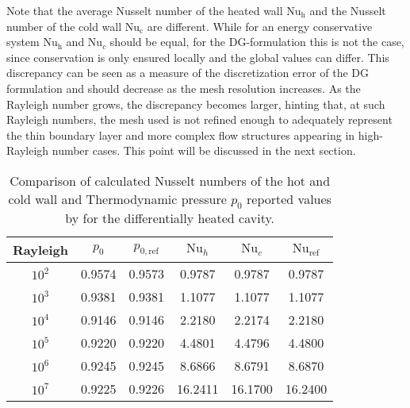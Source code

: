 Note that the average Nusselt number of the heated wall $\text{Nu}_\text{h}$ and the Nusselt number of the cold wall $\text{Nu}_\text{c}$ are different. While for an energy conservative system $\text{Nu}_\text{h}$ and $\text{Nu}_c$ should be equal, for the DG-formulation this is not the case, since conservation is only ensured locally and the global values can differ. This discrepancy can be seen as a measure of the discretization error of the DG formulation and should decrease as the mesh resolution increases. As the Rayleigh number grows, the discrepancy becomes larger, hinting that, at such Rayleigh numbers, the mesh used is not refined enough to adequately represent the thin boundary layer and more complex flow structures appearing in high-Rayleigh number cases. This point will be discussed in the next section.
\begin{table}[t!]
	\begin{center}
		\begin{tabular}{cccccc}
			\hline
			Rayleigh                           & $p_0$  & $p_{0,\text{ref}}$ & $\text{Nu}_{h}$ & $\text{Nu}_{c}$ & $\text{Nu}_{\text{ref}}$ \\ \hline
			\parbox[0pt][13pt][c]{0pt}{}$10^2$ & 0.9574 & 0.9573             & 0.9787          & 0.9787          & 0.9787                   \\
			$10^3$                             & 0.9381 & 0.9381             & 1.1077          & 1.1077          & 1.1077                   \\
			$10^4$                             & 0.9146 & 0.9146             & 2.2180          & 2.2174          & 2.2180                   \\
			$10^5$                             & 0.9220 & 0.9220             & 4.4801          & 4.4796          & 4.4800                   \\
			$10^6$                             & 0.9245 & 0.9245             & 8.6866          & 8.6791          & 8.6870                   \\
			$10^7$                             & 0.9225 & 0.9226             & 16.2411         & 16.1700         & 16.2400                  \\ \hline
		\end{tabular}
	\end{center}
	\caption[Differentially heated cavity: Results of Nusselt number and Thermodynamic pressure]{Comparison of calculated Nusselt numbers of the hot and cold wall and Thermodynamic pressure $p_0$ reported values by \textcite{vierendeelsBenchmarkSolutionsNatural2003} for the differentially heated cavity.}
	\label{tab:p0_Nu_Results}
\end{table}
